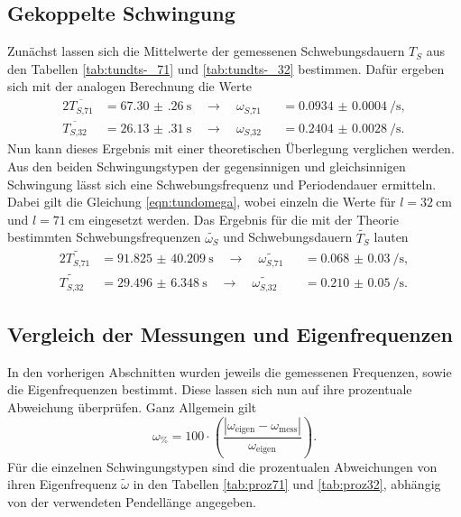 \subsection{Gekoppelte Schwingung}
Zunächst lassen sich die Mittelwerte der gemessenen Schwebungsdauern $T_{S}$ aus den Tabellen \ref{tab:tundts-_71} und \ref{tab:tundts-_32} bestimmen.
Dafür ergeben sich mit der analogen Berechnung die Werte
\begin{alignat*}{2}
    \overline{T_{S\text{,}71}} &= \SI{67.30(26)}{\second} \quad \to \quad \omega_{S\text{,}71} &&= \SI{0.0934(4)}{\per\second}, \\
    \overline{T_{S\text{,}32}} &= \SI{26.13(31)}{\second}\quad \to \quad \omega_{S\text{,}32} &&= \SI{0.2404(28)}{\per\second}. 
\end{alignat*}
Nun kann dieses Ergebnis mit einer theoretischen Überlegung verglichen werden. Aus den beiden Schwingungstypen der gegensinnigen und gleichsinnigen Schwingung lässt sich eine
Schwebungsfrequenz und Periodendauer ermitteln. Dabei gilt die Gleichung \eqref{eqn:tundomega}, wobei einzeln die Werte für $l = \SI{32}{\centi\meter}$ und $l = \SI{71}{\centi\meter}$ eingesetzt werden. Das Ergebnis für die mit
der Theorie bestimmten Schwebungsfrequenzen $\tilde{\omega_{S}}$ und Schwebungsdauern $\tilde{T_{S}}$ lauten
\begin{alignat*}{2}
    \widetilde{T_{S\text{,}71}} &= \SI{91.825(40209)}{\second} \quad \to \quad \widetilde{\omega_{S\text{,}71}} &&= \SI{0.068(30)}{\per\second}, \\
    \widetilde{T_{S\text{,}32}} &= \SI{29.496(6348)}{\second}\quad \to \quad \widetilde{\omega_{S\text{,}32}} &&= \SI{0.210(50)}{\per\second}. 
\end{alignat*}

\subsection{Vergleich der Messungen und Eigenfrequenzen}
In den vorherigen Abschnitten wurden jeweils die gemessenen Frequenzen, sowie die Eigenfrequenzen bestimmt. Diese lassen sich nun auf ihre prozentuale Abweichung überprüfen. 
Ganz Allgemein gilt
\begin{equation}
        \label{eqn:lol}
    \omega_{\si{\percent}} = 100 \cdot \left( \frac{|\omega_{\text{eigen}} - \omega_{\text{mess}}|}{\omega_{\text{eigen}}} \right).
\end{equation}
Für die einzelnen Schwingungstypen sind die prozentualen Abweichungen von ihren Eigenfrequenz $\tilde{\omega}$ in den Tabellen \ref{tab:proz71} und \ref{tab:proz32}, abhängig von der verwendeten Pendellänge angegeben.

